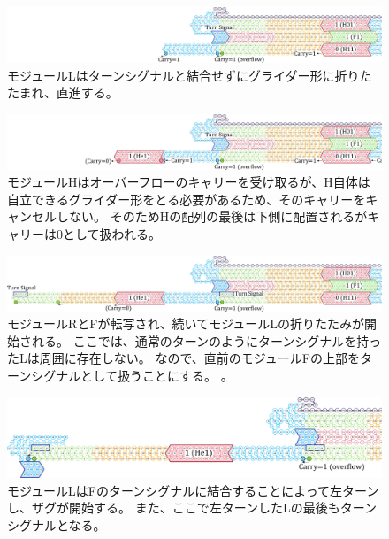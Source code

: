 \documentclass[a4,11pt]{article}
\begin{document}
%
%
%
\begin{figure}[h]
\centering
\includegraphics[width=\linewidth]{fig/svg/CounterEx14_1.pdf}
\caption{
モジュールLはターンシグナルと結合せずにグライダー形に折りたたまれ、直進する。
}
\label{fig:overflowex2}
\end{figure}

\begin{figure}[h]
\centering
\includegraphics[width=\linewidth]{fig/svg/CounterEx15_1.pdf}
\caption{
モジュールHはオーバーフローのキャリーを受け取るが、H自体は自立できるグライダー形をとる必要があるため、そのキャリーをキャンセルしない。
そのためHの配列の最後は下側に配置されるがキャリーは0として扱われる。
}
\label{fig:overflowex3}
\end{figure}


\begin{figure}[h]
\centering
\includegraphics[width=\linewidth]{fig/svg/CounterEx17_1.pdf}
\caption{
モジュールRとFが転写され、続いてモジュールLの折りたたみが開始される。
ここでは、通常のターンのようにターンシグナルを持ったLは周囲に存在しない。
なので、直前のモジュールFの上部をターンシグナルとして扱うことにする。
。
}
\label{fig:overflowex4}
\end{figure}

\begin{figure}[h]
\centering
\includegraphics[width=\linewidth]{fig/svg/CounterEx18_1.pdf}
\caption{
モジュールLはFのターンシグナルに結合することによって左ターンし、ザグが開始する。
また、ここで左ターンしたLの最後もターンシグナルとなる。
}
\label{fig:overflowex5}
\end{figure}
%
%
%
\end{document}
